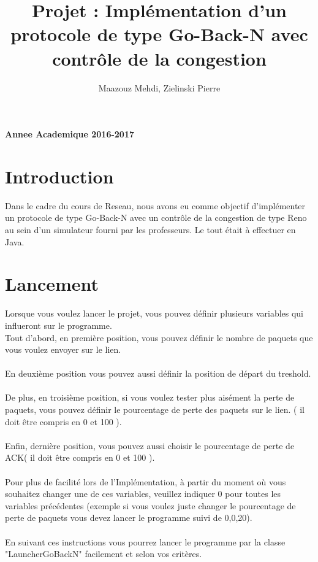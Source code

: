 \documentclass[a4paper,10pt]{article}
\title{Projet : Implémentation d'un protocole de type Go-Back-N avec contrôle de la congestion}
\author{Maazouz Mehdi, Zielinski Pierre}
\begin{document}
\maketitle
\textbf{Annee Academique 2016-2017}\\
\tableofcontents
\newpage

\section{Introduction}
Dans le cadre du cours de Reseau, nous avons eu comme objectif d'implémenter un protocole de type Go-Back-N
avec un contrôle de la congestion de type Reno au sein d'un simulateur fourni par les professeurs. Le tout était 
à effectuer en Java.

\section{Lancement}
Lorsque vous voulez lancer le projet, vous pouvez définir plusieurs variables qui influeront sur le programme.\\
Tout d'abord, en première position, vous pouvez définir le nombre de paquets que vous voulez envoyer sur le lien.\\
\\
En deuxième position vous pouvez aussi définir la position de départ du treshold.\\
\\
De plus, en troisième position, si vous voulez tester plus aisément la perte de paquets, vous pouvez définir le pourcentage de perte des paquets sur le lien.
( il doit être compris en 0 et 100 ).\\
\\
Enfin, dernière position, vous pouvez aussi choisir le pourcentage de perte de ACK( il doit être compris en 0 et 100 ).\\
\\
Pour plus de facilité lors de l'Implémentation, à partir du moment où vous souhaitez changer une de ces variables, veuillez indiquer 0 pour toutes les variables précédentes (exemple si vous voulez juste changer le pourcentage de perte de paquets vous devez lancer le programme suivi de 0,0,20).\\
\\
En suivant ces instructions vous pourrez lancer le programme par la classe "LauncherGoBackN" facilement et selon vos critères.
\end{document}
